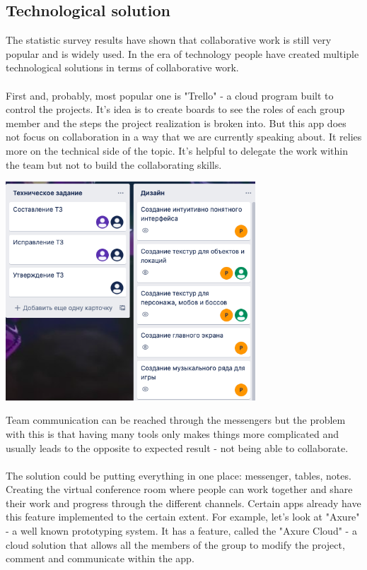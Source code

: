 \documentclass[10pt,oneside,english,a4paper]{article}
\begin{document}
\subsection{Technological solution}
The statistic survey results have shown that collaborative work is still very popular and is widely used. In the era of technology people have created multiple technological solutions in terms of collaborative work. \paragraph{}
First and, probably, most popular one is "Trello" - a cloud program built to control the projects. It's idea is to create boards to see the roles of each group member and the steps the project realization is broken into. But this app does not focus on collaboration in a way that we are currently speaking about. It relies more on the technical side of the topic. It's helpful to delegate the work within the team but not to build the collaborating skills.\par
\begin{center}
\includegraphics[width=0.7\textwidth]{Trello.png} 
\end{center}
Team communication can be reached through the messengers but the problem with this is that having many tools only makes things more complicated and usually leads to the opposite to expected result - not being able to collaborate. \paragraph{}
The solution could be putting everything in one place: messenger, tables, notes. Creating the virtual conference room where people can work together and share their work and progress through the different channels. Certain apps already have this feature implemented to the certain extent. For example, let's look at "Axure" - a well known prototyping system. It has a feature, called the "Axure Cloud" - a cloud solution that allows all the members of the group to modify the project, comment and communicate within the app. 
\end{document}
